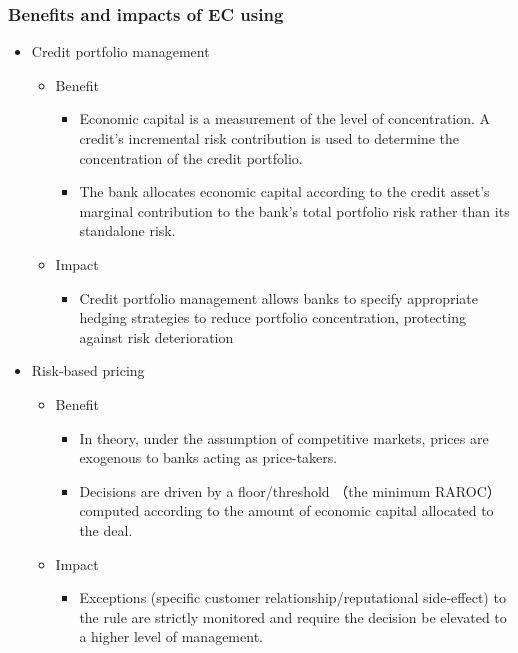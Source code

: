 \subsubsection{Benefits and impacts of EC using}
\begin{itemize}
\item Credit portfolio management
    \begin{itemize}
    \item Benefit
        \begin{itemize}
        \item Economic capital is a measurement of the level of concentration. A credit's incremental risk contribution is used to determine the concentration of the credit portfolio.
        \item The bank allocates economic capital according to the credit asset's marginal contribution to the bank's total portfolio risk rather than its standalone risk.
        \end{itemize}
    \item Impact
        \begin{itemize}
        \item Credit portfolio management allows banks to specify appropriate hedging strategies to reduce portfolio concentration, protecting against risk deterioration
        \end{itemize}
    \end{itemize}
\item Risk-based pricing
    \begin{itemize}
    \item Benefit
        \begin{itemize}
        \item In theory, under the assumption of competitive markets, prices are exogenous to banks acting as price-takers.
        \item Decisions are driven by a floor/threshold （the minimum RAROC） computed according to the amount of economic capital allocated to the deal.
        \end{itemize}
    \item Impact
        \begin{itemize}
        \item Exceptions (specific customer relationship/reputational side-effect) to the rule are strictly monitored and require the decision be elevated to a higher level of management.
        \end{itemize}
    \end{itemize}

\end{itemize}
